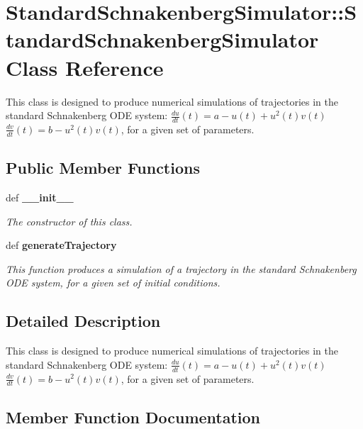 \section{StandardSchnakenbergSimulator::StandardSchnakenbergSimulator Class Reference}
\label{class_standard_schnakenberg_simulator_1_1_standard_schnakenberg_simulator}


This class is designed to produce numerical simulations of trajectories in the standard Schnakenberg ODE system: $ \frac{du}{dt}(t) = a - u(t) + u^2(t)v(t) $ $ \frac{dv}{dt}(t) = b - u^2(t)v(t) $, for a given set of parameters.  


\subsection*{Public Member Functions}
\begin{DoxyCompactItemize}
\item 
def {\bf \_\-\_\-init\_\-\_\-}
\begin{DoxyCompactList}\small\item\em The constructor of this class. \item\end{DoxyCompactList}\item 
def {\bf generateTrajectory}
\begin{DoxyCompactList}\small\item\em This function produces a simulation of a trajectory in the standard Schnakenberg ODE system, for a given set of initial conditions. \item\end{DoxyCompactList}\end{DoxyCompactItemize}


\subsection{Detailed Description}
This class is designed to produce numerical simulations of trajectories in the standard Schnakenberg ODE system: $ \frac{du}{dt}(t) = a - u(t) + u^2(t)v(t) $ $ \frac{dv}{dt}(t) = b - u^2(t)v(t) $, for a given set of parameters. 

\subsection{Member Function Documentation}
